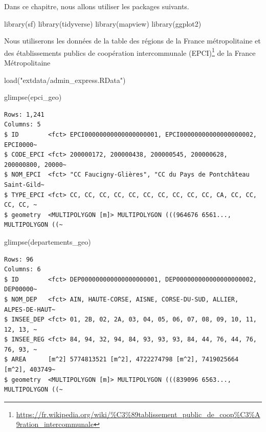 \documentclass[
]{book}
\newenvironment{Shaded}{\begin{snugshade}}{\end{snugshade}}
\newcommand{\FunctionTok}[1]{\textcolor[rgb]{0.00,0.00,0.00}{#1}}
\newcommand{\NormalTok}[1]{#1}
\newcommand{\StringTok}[1]{\textcolor[rgb]{0.31,0.60,0.02}{#1}}
\begin{document}
Dans ce chapitre, nous allons utiliser les packages suivants.

\begin{Shaded}
\begin{Highlighting}[]
\FunctionTok{library}\NormalTok{(sf)}
\FunctionTok{library}\NormalTok{(tidyverse)}
\FunctionTok{library}\NormalTok{(mapview)}
\FunctionTok{library}\NormalTok{(ggplot2)}
\end{Highlighting}
\end{Shaded}

Nous utiliserons les données de la table des régions de la France métropolitaine et des établissements publics de coopération intercommunale (EPCI)\footnote{\url{https://fr.wikipedia.org/wiki/\%C3\%89tablissement_public_de_coop\%C3\%A9ration_intercommunale}} de la France Métropolitaine

\begin{Shaded}
\begin{Highlighting}[]
\FunctionTok{load}\NormalTok{(}\StringTok{"extdata/admin\_express.RData"}\NormalTok{)}
\end{Highlighting}
\end{Shaded}

\begin{Shaded}
\begin{Highlighting}[]
\FunctionTok{glimpse}\NormalTok{(epci\_geo)}
\end{Highlighting}
\end{Shaded}

\begin{verbatim}
Rows: 1,241
Columns: 5
$ ID        <fct> EPCI00000000000000000001, EPCI00000000000000000002, EPCI0000~
$ CODE_EPCI <fct> 200000172, 200000438, 200000545, 200000628, 200000800, 20000~
$ NOM_EPCI  <fct> "CC Faucigny-Glières", "CC du Pays de Pontchâteau Saint-Gild~
$ TYPE_EPCI <fct> CC, CC, CC, CC, CC, CC, CC, CC, CC, CC, CA, CC, CC, CC, CC, ~
$ geometry  <MULTIPOLYGON [m]> MULTIPOLYGON (((964676 6561..., MULTIPOLYGON ((~
\end{verbatim}

\begin{Shaded}
\begin{Highlighting}[]
\FunctionTok{glimpse}\NormalTok{(departements\_geo)}
\end{Highlighting}
\end{Shaded}

\begin{verbatim}
Rows: 96
Columns: 6
$ ID        <fct> DEP000000000000000000001, DEP000000000000000000002, DEP00000~
$ NOM_DEP   <fct> AIN, HAUTE-CORSE, AISNE, CORSE-DU-SUD, ALLIER, ALPES-DE-HAUT~
$ INSEE_DEP <fct> 01, 2B, 02, 2A, 03, 04, 05, 06, 07, 08, 09, 10, 11, 12, 13, ~
$ INSEE_REG <fct> 84, 94, 32, 94, 84, 93, 93, 93, 84, 44, 76, 44, 76, 76, 93, ~
$ AREA      [m^2] 5774813521 [m^2], 4722274798 [m^2], 7419025664 [m^2], 403749~
$ geometry  <MULTIPOLYGON [m]> MULTIPOLYGON (((839096 6563..., MULTIPOLYGON ((~
\end{verbatim}
\end{document}
